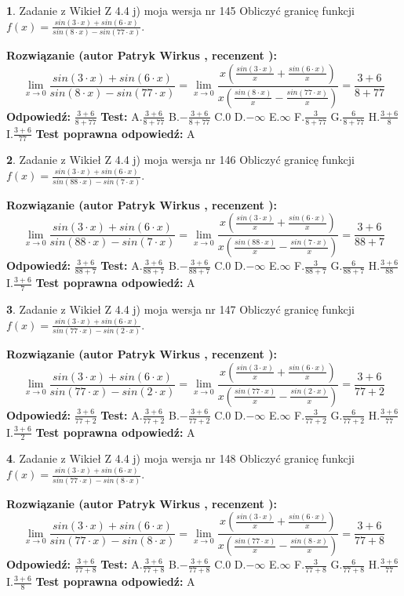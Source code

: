 \documentclass[12pt, a4paper]{article}
\theoremstyle{definition} %
\newtheorem{zad}{}
\newcommand{\zadStart}[1]{\begin{zad}#1\newline}
\newcommand{\zadStop}{\end{zad}}
\newcommand{\rozwStart}[2]{\noindent \textbf{Rozwiązanie (autor #1 , recenzent #2): }\newline}
\newcommand{\rozwStop}{\newline}
\newcommand{\odpStart}{\noindent \textbf{Odpowiedź:}\newline}
\newcommand{\odpStop}{\newline}
\newcommand{\testStart}{\noindent \textbf{Test:}\newline}
\newcommand{\testStop}{\newline}
\newcommand{\kluczStart}{\noindent \textbf{Test poprawna odpowiedź:}\newline}
\newcommand{\kluczStop}{\newline}
\begin{document}
\zadStart{Zadanie z Wikieł Z 4.4 j) moja wersja nr 145}
Obliczyć granicę funkcji $f(x)=\frac{sin(3\cdot x) +sin(6\cdot x)}{sin(8\cdot x) -sin(77\cdot x)}$.
\zadStop
\rozwStart{Patryk Wirkus}{}
$$\lim\limits_{x\to 0}\frac{sin(3\cdot x) +sin(6\cdot x)}{sin(8\cdot x) -sin(77\cdot x)}=\lim\limits_{x\to 0}\frac{x(\frac{sin(3\cdot x)}{x}+\frac{sin(6\cdot x)}{x})}{x(\frac{sin(8\cdot x)}{x}-\frac{sin(77\cdot x)}{x})}=\frac{3+6}{8+77}$$
\rozwStop
\odpStart
$\frac{3+6}{8+77}$
\odpStop
\testStart
A.$\frac{3+6}{8+77}$
B.$-\frac{3+6}{8+77}$
C.$0$
D.$-\infty$
E.$\infty$
F.$\frac{3}{8+77}$
G.$\frac{6}{8+77}$
H.$\frac{3+6}{8}$
I.$\frac{3+6}{77}$
\testStop
\kluczStart
A
\kluczStop



\zadStart{Zadanie z Wikieł Z 4.4 j) moja wersja nr 146}
Obliczyć granicę funkcji $f(x)=\frac{sin(3\cdot x) +sin(6\cdot x)}{sin(88\cdot x) -sin(7\cdot x)}$.
\zadStop
\rozwStart{Patryk Wirkus}{}
$$\lim\limits_{x\to 0}\frac{sin(3\cdot x) +sin(6\cdot x)}{sin(88\cdot x) -sin(7\cdot x)}=\lim\limits_{x\to 0}\frac{x(\frac{sin(3\cdot x)}{x}+\frac{sin(6\cdot x)}{x})}{x(\frac{sin(88\cdot x)}{x}-\frac{sin(7\cdot x)}{x})}=\frac{3+6}{88+7}$$
\rozwStop
\odpStart
$\frac{3+6}{88+7}$
\odpStop
\testStart
A.$\frac{3+6}{88+7}$
B.$-\frac{3+6}{88+7}$
C.$0$
D.$-\infty$
E.$\infty$
F.$\frac{3}{88+7}$
G.$\frac{6}{88+7}$
H.$\frac{3+6}{88}$
I.$\frac{3+6}{7}$
\testStop
\kluczStart
A
\kluczStop



\zadStart{Zadanie z Wikieł Z 4.4 j) moja wersja nr 147}
Obliczyć granicę funkcji $f(x)=\frac{sin(3\cdot x) +sin(6\cdot x)}{sin(77\cdot x) -sin(2\cdot x)}$.
\zadStop
\rozwStart{Patryk Wirkus}{}
$$\lim\limits_{x\to 0}\frac{sin(3\cdot x) +sin(6\cdot x)}{sin(77\cdot x) -sin(2\cdot x)}=\lim\limits_{x\to 0}\frac{x(\frac{sin(3\cdot x)}{x}+\frac{sin(6\cdot x)}{x})}{x(\frac{sin(77\cdot x)}{x}-\frac{sin(2\cdot x)}{x})}=\frac{3+6}{77+2}$$
\rozwStop
\odpStart
$\frac{3+6}{77+2}$
\odpStop
\testStart
A.$\frac{3+6}{77+2}$
B.$-\frac{3+6}{77+2}$
C.$0$
D.$-\infty$
E.$\infty$
F.$\frac{3}{77+2}$
G.$\frac{6}{77+2}$
H.$\frac{3+6}{77}$
I.$\frac{3+6}{2}$
\testStop
\kluczStart
A
\kluczStop



\zadStart{Zadanie z Wikieł Z 4.4 j) moja wersja nr 148}
Obliczyć granicę funkcji $f(x)=\frac{sin(3\cdot x) +sin(6\cdot x)}{sin(77\cdot x) -sin(8\cdot x)}$.
\zadStop
\rozwStart{Patryk Wirkus}{}
$$\lim\limits_{x\to 0}\frac{sin(3\cdot x) +sin(6\cdot x)}{sin(77\cdot x) -sin(8\cdot x)}=\lim\limits_{x\to 0}\frac{x(\frac{sin(3\cdot x)}{x}+\frac{sin(6\cdot x)}{x})}{x(\frac{sin(77\cdot x)}{x}-\frac{sin(8\cdot x)}{x})}=\frac{3+6}{77+8}$$
\rozwStop
\odpStart
$\frac{3+6}{77+8}$
\odpStop
\testStart
A.$\frac{3+6}{77+8}$
B.$-\frac{3+6}{77+8}$
C.$0$
D.$-\infty$
E.$\infty$
F.$\frac{3}{77+8}$
G.$\frac{6}{77+8}$
H.$\frac{3+6}{77}$
I.$\frac{3+6}{8}$
\testStop
\kluczStart
A
\kluczStop
\end{document}
